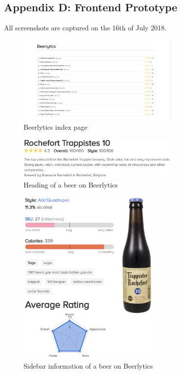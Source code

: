 \subsection*{Appendix D: Frontend Prototype} \label{sec:appendix-d}
All screenshots are captured on the 16th of July 2018.

\begin{figure}[h]
\includegraphics[width=8cm]{assets/beerlytics_index.png}
\caption{Beerlytics index page}
\centering
\label{fig:beerlytics-index}
\end{figure}

\begin{figure}[h]
\includegraphics[width=8cm]{assets/beer_heading.png}
\caption{Heading of a beer on Beerlytics}
\centering
\label{fig:beer-heading}
\end{figure}

\begin{figure}[h]
\includegraphics[width=7cm]{assets/beer_sidebar.png}
\caption{Sidebar information of a beer on Beerlytics}
\centering
\label{fig:beer-sidebar}
\end{figure}

